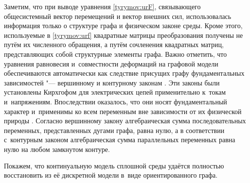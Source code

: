 Заметим, что при выводе уравнения \eqref{tyrymov:urF}, связывающего общесистемный вектор перемещений и вектор внешних сил,
использовалась информация только о структуре графа и физическом законе среды. 
Кроме этого, используемые в \eqref{tyrymov:urf} квадратные матрицы преобразования получены не путём их численного обращения,
а путём сочленения квадратных матриц, представляющих собой структурные элементы графа. 
Важно отметить, что уравнения равновесия и~совместности деформаций на графовой модели обеспечиваются автоматически как следствие присущих графу фундаментальных зависимостей "--- вершинному и контурному законам \cite{tyr:bib:6}. 
Эти законы были установлены Кирхгофом для электрических цепей применительно к~токам и~напряжениям. 
Впоследствии оказалось, что они носят фундаментальный характер и~применимы ко всем переменным вне зависимости от их физической природы \cite{tyr:bib:5}.
Согласно вершинному закону алгебраическая сумма последовательных переменных, представленных дугами графа, равна нулю, а в
соответствии с~контурным законом алгебраическая сумма параллельных переменных равна нулю на любом замкнутом контуре.

Покажем, что континуальную модель сплошной среды удаётся полностью восстановить из её дискретной модели в~виде ориентированного
графа.

